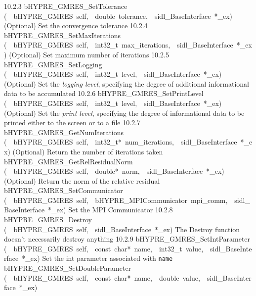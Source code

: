 \documentclass{article}
\begin{document}
\begin{cxxentry}
\begin{cxxentry}
\begin{cxxnames}
        {10.2.3}
        {bHYPRE\_GMRES\_SetTolerance}
        {(\ \ bHYPRE\_GMRES\ self,\ \ double\ tolerance,\ \ sidl\_BaseInterface\ *\_ex)}
        {
(Optional) Set the convergence tolerance}
        {10.2.4}
        {bHYPRE\_GMRES\_SetMaxIterations}
        {(\ \ bHYPRE\_GMRES\ self,\ \ int32\_t\ max\_iterations,\ \ sidl\_BaseInterface\ *\_ex)}
        {
(Optional) Set maximum number of iterations}
        {10.2.5}
        {bHYPRE\_GMRES\_SetLogging}
        {(\ \ bHYPRE\_GMRES\ self,\ \ int32\_t\ level,\ \ sidl\_BaseInterface\ *\_ex)}
        {
(Optional) Set the {\it logging level}, specifying the degree
of additional informational data to be accumulated}
        {10.2.6}
        {bHYPRE\_GMRES\_SetPrintLevel}
        {(\ \ bHYPRE\_GMRES\ self,\ \ int32\_t\ level,\ \ sidl\_BaseInterface\ *\_ex)}
        {
(Optional) Set the {\it print level}, specifying the degree
of informational data to be printed either to the screen or
to a file}
        {10.2.7}
        {bHYPRE\_GMRES\_GetNumIterations}
        {(\ \ bHYPRE\_GMRES\ self,\ \ int32\_t*\ num\_iterations,\ \ sidl\_BaseInterface\ *\_ex)}
        {
(Optional) Return the number of iterations taken}
        {}
\label{cxx.10.2.18}
        {bHYPRE\_GMRES\_GetRelResidualNorm}
        {(\ \ bHYPRE\_GMRES\ self,\ \ double*\ norm,\ \ sidl\_BaseInterface\ *\_ex)}
        {
(Optional) Return the norm of the relative residual}
        {}
\label{cxx.10.2.19}
        {bHYPRE\_GMRES\_SetCommunicator}
        {(\ \ bHYPRE\_GMRES\ self,\ \ bHYPRE\_MPICommunicator\ mpi\_comm,\ \ sidl\_BaseInterface\ *\_ex)}
        {
Set the MPI Communicator}
        {10.2.8}
        {bHYPRE\_GMRES\_Destroy}
        {(\ \ bHYPRE\_GMRES\ self,\ \ sidl\_BaseInterface\ *\_ex)}
        {
The Destroy function doesn't necessarily destroy anything}
        {10.2.9}
        {bHYPRE\_GMRES\_SetIntParameter}
        {(\ \ bHYPRE\_GMRES\ self,\ \ const\ char*\ name,\ \ int32\_t\ value,\ \ sidl\_BaseInterface\ *\_ex)}
        {
Set the int parameter associated with {\tt name}}
        {}
\label{cxx.10.2.20}
        {bHYPRE\_GMRES\_SetDoubleParameter}
        {(\ \ bHYPRE\_GMRES\ self,\ \ const\ char*\ name,\ \ double\ value,\ \ sidl\_BaseInterface\ *\_ex)}

\end{cxxnames}
\end{cxxentry}
\end{cxxentry}
\end{document}
